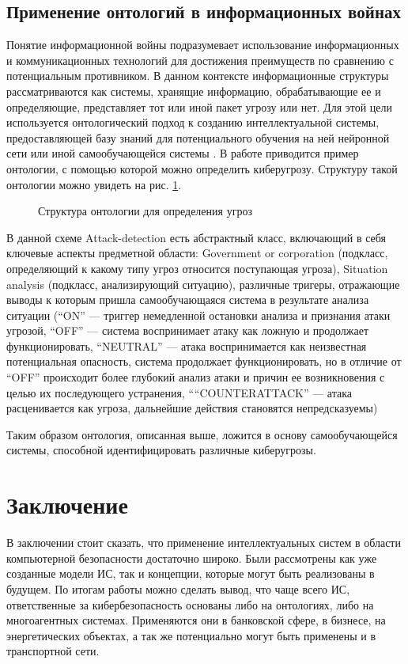 \subsection{Применение онтологий в информационных войнах}
Понятие информационной войны подразумевает использование информационных и коммуникационных
технологий для достижения преимуществ по сравнению с потенциальным противником. В данном контексте
информационные структуры рассматриваются как системы, хранящие информацию, обрабатывающие ее и определяющие,
представляет тот или иной пакет угрозу или нет. Для этой цели используется онтологический подход к созданию
интеллектуальной системы, предоставляющей базу знаний для потенциального обучения на ней нейронной сети
или иной самообучающейся системы \cite{wars}. В работе \cite{wars} приводится пример онтологии, с помощью которой
можно определить киберугрозу. Структуру такой онтологии можно увидеть на рис. \ref{ont}.

\begin{figure}[h]
    \caption{Структура онтологии для определения угроз \cite{wars}}
    \label{ont}
\end{figure}

В данной схеме Attack-detection есть абстрактный класс, включающий в себя ключевые аспекты предметной
области: Government or corporation (подкласс, определяющий к какому типу угроз относится поступающая угроза),
Situation analysis (подкласс, анализирующий ситуацию), различные тригеры, отражающие выводы к которым пришла
самообучающаяся система в результате анализа ситуации (``ON'' --- триггер немедленной остановки анализа и
признания атаки угрозой, ``OFF'' --- система воспринимает атаку как ложную и продолжает функционировать,
``NEUTRAL'' --- атака воспринимается как неизвестная потенциальная опасность, система продолжает функционировать,
но в отличие от ``OFF'' происходит более глубокий анализ атаки и причин ее возникновения с целью их
последующего устранения, ``“COUNTERATTACK'' --- атака расценивается как угроза, дальнейшие действия становятся
непредсказуемы)

Таким образом онтология, описанная выше, ложится в основу самообучающейся системы, способной идентифицировать
различные киберугрозы.

\section{Заключение}
В заключении стоит сказать, что применение интеллектуальных систем в области компьютерной безопасности
достаточно широко. Были рассмотрены как уже созданные модели ИС, так и концепции, которые могут
быть реализованы в будущем. По итогам работы можно сделать вывод, что чаще всего ИС, ответственные за
кибербезопасность основаны либо на онтологиях, либо на многоагентных системах. Применяются они в банковской
сфере, в бизнесе, на энергетических объектах, а так же потенциально могут быть применены и в транспортной сети.


